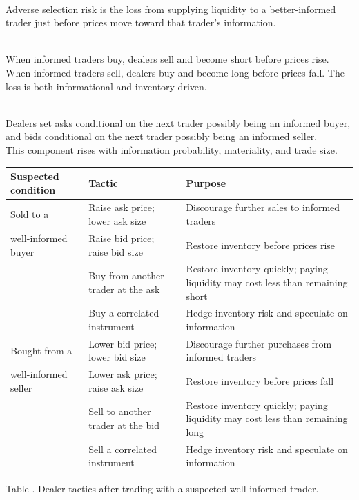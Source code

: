 \documentclass[a4paper,oneside,openany]{book}
\begin{document}
\begin{definition} \\
Adverse selection risk is the loss from supplying liquidity to a better-informed trader just before prices move toward that trader's information.
\end{definition}

\begin{mechanism} \\
When informed traders buy, dealers sell and become short before prices rise. When informed traders sell, dealers buy and become long before prices fall. The loss is both informational and inventory-driven.
\end{mechanism}

\begin{principle} \\
Dealers set asks conditional on the next trader possibly being an informed buyer, and bids conditional on the next trader possibly being an informed seller.\\
This component rises with information probability, materiality, and trade size.
\end{principle}

\begin{table}[htbp]
\centering
\scriptsize
{}
\renewcommand{\arraystretch}{1.13}
\setlength{\tabcolsep}{4pt}
\begin{tabularx}{\textwidth}{@{}>{\RaggedRight\arraybackslash}p{} >{\RaggedRight\arraybackslash}p{} >{\RaggedRight\arraybackslash}X@{}}
\hline
\textbf{Suspected condition} & \textbf{Tactic} & \textbf{Purpose} \\
\hline
Sold to a & Raise ask price; lower ask size & Discourage further sales to informed traders \\
well-informed buyer & Raise bid price; raise bid size & Restore inventory before prices rise \\
& Buy from another trader at the ask & Restore inventory quickly; paying liquidity may cost less than remaining short \\
& Buy a correlated instrument & Hedge inventory risk and speculate on information \\
\hline
Bought from a & Lower bid price; lower bid size & Discourage further purchases from informed traders \\
well-informed seller & Lower ask price; raise ask size & Restore inventory before prices fall \\
& Sell to another trader at the bid & Restore inventory quickly; paying liquidity may cost less than remaining long \\
& Sell a correlated instrument & Hedge inventory risk and speculate on information \\
\hline
\end{tabularx}

\vspace{0.25em}
{\footnotesize Table \thetable. Dealer tactics after trading with a suspected well-informed trader.}
\end{table}
\end{document}
